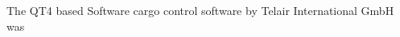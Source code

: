 \documentclass[
	12pt,
	a4paper,
	bibtotoc,
	cleardoubleempty,
	idxtotoc,
	openright,
	final,
	listof=nochaptergap,
	]{scrbook}
\begin{document}
\label{cha:software}
The QT4 based Software cargo control software by Telair International GmbH was
\end{document}
